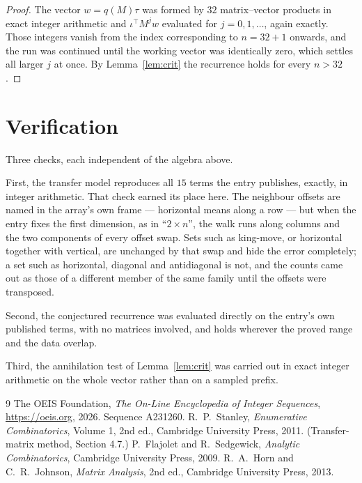 \documentclass[11pt,a4paper]{article}
\theoremstyle{plain}
\theoremstyle{definition}
\begin{document}
\begin{proof}
The vector $w=q(M)\tau$ was formed by $32$ matrix--vector products in exact integer
arithmetic and $\iota^{\!\top}M^{j}w$ evaluated for $j=0,1,\dots$, again exactly. Those
integers vanish from the index corresponding to $n=32+1$ onwards, and the run was
continued until the working vector was identically zero, which settles all larger $j$ at once.
By Lemma~\ref{lem:crit} the recurrence holds for every $n>32$.
\end{proof}

\section{Verification}

Three checks, each independent of the algebra above.

First, the transfer model reproduces all $15$ terms the entry publishes, exactly, in
integer arithmetic. That check earned its place here. The neighbour offsets are named in the
array's own frame --- horizontal means along a row --- but when the entry fixes the first
dimension, as in ``$2\times n$'', the walk runs along columns and the two components of every
offset swap. Sets such as king-move, or horizontal together with vertical, are unchanged by
that swap and hide the error completely; a set such as horizontal, diagonal and antidiagonal
is not, and the counts came out as those of a different member of the same family until the
offsets were transposed.

Second, the conjectured recurrence was evaluated directly on the entry's own published terms,
with no matrices involved, and holds wherever the proved range and the data overlap.

Third, the annihilation test of Lemma~\ref{lem:crit} was carried out in exact integer
arithmetic on the whole vector rather than on a sampled prefix.

\begin{thebibliography}{9}
 The OEIS Foundation, \emph{The On-Line Encyclopedia of Integer
Sequences}, \url{https://oeis.org}, 2026. Sequence A231260.
 R.~P.~Stanley, \emph{Enumerative Combinatorics}, Volume 1, 2nd ed.,
Cambridge University Press, 2011. (Transfer-matrix method, Section 4.7.)
 P.~Flajolet and R.~Sedgewick, \emph{Analytic Combinatorics}, Cambridge
University Press, 2009.
 R.~A.~Horn and C.~R.~Johnson, \emph{Matrix Analysis}, 2nd ed., Cambridge
University Press, 2013.
\end{thebibliography}
\end{document}
